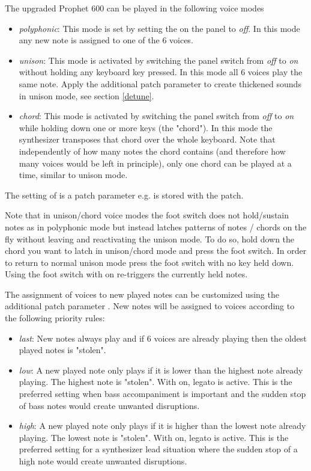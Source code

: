 The upgraded Prophet 600 can be played in the following voice modes
\begin{itemize}
  \setlength\itemsep{0cm}
  \item \textit{polyphonic}: This mode is set by setting the \unison on the panel to \textit{off}. In this mode any new note is assigned to one of the 6 voices. 
  \item \textit{unison}: This mode is activated by switching the panel \unison switch from \textit{off} to \textit{on} without holding any keyboard key pressed. In this mode all 6 voices play the same note. Apply the additional patch parameter \detune to create thickened sounds in unison mode, see section \ref{detune}.
  \item \textit{chord}: This mode is activated by switching the panel \unison switch from \textit{off} to \textit{on} while holding down one or more keys (the "chord"). In this mode the synthesizer transposes that chord over the whole keyboard. Note that independently of how many notes the chord contains (and therefore how many voices would be left in principle), only one chord can be played at a time, similar to unison mode.
\end{itemize} 

The setting of \unison is a patch parameter e.g. is stored with the patch.

Note that in unison/chord voice modes the foot switch does not hold/sustain notes as in polyphonic mode but instead latches patterns of notes / chords on the fly without leaving and reactivating the unison mode. To do so, hold down the chord you want to latch in unison/chord mode and press the foot switch. In order to return to normal unison mode press the foot switch with no key held down. Using the foot switch with \unison on re-triggers the currently held notes. 

The assignment of voices to new played notes can be customized using the additional patch parameter \prio. New notes will be assigned to voices according to the following priority rules:

\begin{itemize}
  \setlength\itemsep{0cm}
  \item \textit{last}: New notes always play and if 6 voices are already playing then the oldest played notes is "stolen".
  \item \textit{low}: A new played note only plays if it is lower than the highest note already playing. The highest note is "stolen". With \unison on, legato is active. This is the preferred setting when bass accompaniment is important and the sudden stop of bass notes would create unwanted disruptions. 
  \item \textit{high}: A new played note only plays if it is higher than the lowest note already playing. The lowest note is "stolen". With \unison on, legato is active. This is the preferred setting for a synthesizer lead situation where the sudden stop of a high note would create unwanted disruptions. 
\end{itemize}

